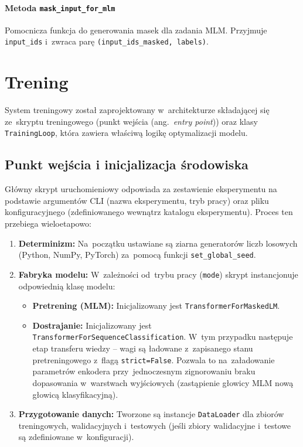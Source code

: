 \documentclass[a4paper,11pt,twoside]{report}
\theoremstyle{definition}
\begin{document}
\paragraph{Metoda \texttt{mask\_input\_for\_mlm}}
Pomocnicza funkcja do generowania masek dla zadania MLM. Przyjmuje \texttt{input\_ids} i~zwraca parę \texttt{(input\_ids\_masked, labels)}.



\section{Trening}\label{sec:system-training}

System treningowy został zaprojektowany w~architekturze składającej się ze~skryptu treningowego (punkt wejścia (ang.\ \emph{entry point})) oraz klasy \texttt{TrainingLoop}, która zawiera właściwą logikę optymalizacji modelu.

\subsection{Punkt wejścia i inicjalizacja środowiska}\label{sec:training-script}
Główny skrypt uruchomieniowy odpowiada za zestawienie eksperymentu na podstawie argumentów CLI (nazwa eksperymentu, tryb pracy) oraz pliku konfiguracyjnego (zdefiniowanego wewnątrz katalogu eksperymentu). Proces ten przebiega wieloetapowo:

\begin{enumerate}
    \item \textbf{Determinizm:} Na~początku ustawiane są ziarna generatorów liczb losowych (Python, NumPy, PyTorch) za~pomocą funkcji \texttt{set\_global\_seed}.
    \item \textbf{Fabryka modelu:} W~zależności od~trybu pracy (\texttt{mode}) skrypt instancjonuje odpowiednią klasę modelu:
    \begin{itemize}
    \item \textbf{Pretrening (MLM):} Inicjalizowany jest \texttt{TransformerForMaskedLM}.
        \item \textbf{Dostrajanie:} Inicjalizowany jest \texttt{TransformerForSequenceClassification}. W~tym przypadku następuje etap transferu wiedzy -- wagi są ładowane z~zapisanego stanu pretreningowego z~flagą \texttt{strict=False}. Pozwala to na~załadowanie parametrów enkodera przy~jednoczesnym zignorowaniu braku dopasowania w~warstwach wyjściowych (zastąpienie głowicy MLM nową głowicą klasyfikacyjną).
    \end{itemize}
    \item \textbf{Przygotowanie danych:} Tworzone są instancje \texttt{DataLoader} dla zbiorów treningowych, walidacyjnych i~testowych (jeśli zbiory walidacyjne i~testowe są zdefiniowane w~konfiguracji).
\end{enumerate}
\end{document}
